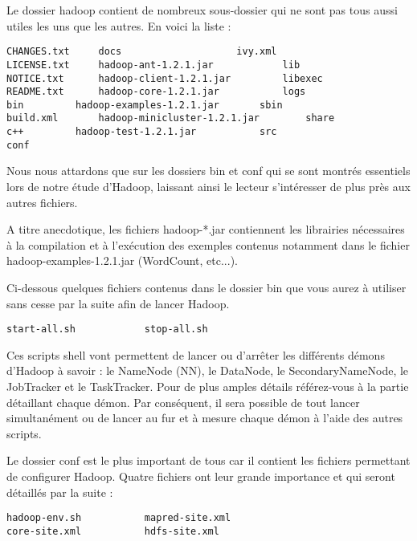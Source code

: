 \par Le dossier hadoop contient de nombreux sous-dossier qui ne sont pas tous aussi utiles les uns que les autres. En voici la liste :

\begin{verbatim}
CHANGES.txt		docs					ivy.xml
LICENSE.txt		hadoop-ant-1.2.1.jar			lib
NOTICE.txt		hadoop-client-1.2.1.jar			libexec
README.txt		hadoop-core-1.2.1.jar			logs
bin			hadoop-examples-1.2.1.jar		sbin
build.xml		hadoop-minicluster-1.2.1.jar		share
c++			hadoop-test-1.2.1.jar			src
conf
\end{verbatim}

\par Nous nous attardons que sur les dossiers bin et conf qui se sont montrés essentiels lors de notre étude d'Hadoop, laissant ainsi le lecteur s'intéresser de plus près aux autres fichiers.

\par A titre anecdotique, les fichiers hadoop-*.jar contiennent les librairies nécessaires à la compilation et à l'exécution des exemples contenus notamment dans le fichier hadoop-examples-1.2.1.jar (WordCount, etc...).

\par Ci-dessous quelques fichiers contenus dans le dossier bin que vous aurez à utiliser sans cesse par la suite afin de lancer Hadoop.

\begin{verbatim}
start-all.sh			stop-all.sh			
\end{verbatim}

\par Ces scripts shell vont permettent de lancer ou d'arrêter les différents démons d'Hadoop à savoir : le NameNode (NN), le DataNode, le SecondaryNameNode, le JobTracker et le TaskTracker. Pour de plus amples détails référez-vous à la partie détaillant chaque démon. Par conséquent, il sera possible de tout lancer simultanément ou de lancer au fur et à mesure chaque démon à l'aide des autres scripts.

\par Le dossier conf est le plus important de tous car il contient les fichiers permettant de configurer Hadoop. Quatre fichiers ont leur grande importance et qui seront détaillés par la suite :

\begin{verbatim}
hadoop-env.sh			mapred-site.xml
core-site.xml			hdfs-site.xml
\end{verbatim}

